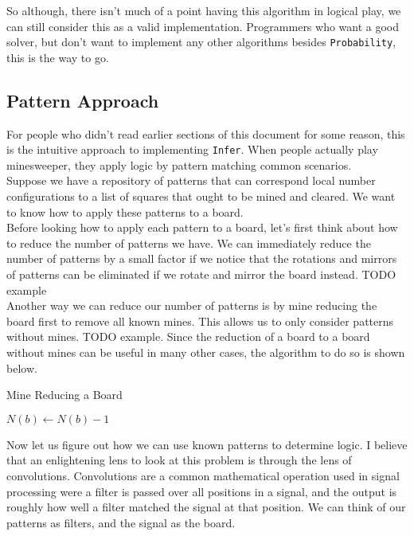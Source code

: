 So although, there isn't much of a point having this algorithm in logical play, we can still consider this as a valid implementation. Programmers who want a good solver, but don't want to implement any other algorithms besides \texttt{Probability}, this is the way to go.\\

\subsection{Pattern Approach}

For people who didn't read earlier sections of this document for some reason, this is the intuitive approach to implementing \texttt{Infer}. When people actually play minesweeper, they apply logic by pattern matching common scenarios.\\

Suppose we have a repository of patterns that can correspond local number configurations to a list of squares that ought to be mined and cleared. We want to know how to apply these patterns to a board.\\

Before looking how to apply each pattern to a board, let's first think about how to reduce the number of patterns we have. We can immediately reduce the number of patterns by a small factor if we notice that the rotations and mirrors of patterns can be eliminated if we rotate and mirror the board instead. TODO example\\

Another way we can reduce our number of patterns is by mine reducing the board first to remove all known mines. This allows us to only consider patterns without mines. TODO example. Since the reduction of a board to a board without mines can be useful in many other cases, the algorithm to do so is shown below.\\

\begin{algorithm}[h]
\caption*{Mine Reducing a Board}
\begin{algorithmic}
            $N(b)\gets N(b)-1$
        \EndIf
    \EndFor
\EndFor
{}
\EndFunction
\end{algorithmic}
\end{algorithm}

Now let us figure out how we can use known patterns to determine logic. I believe that an enlightening lens to look at this problem is through the lens of convolutions. Convolutions are a common mathematical operation used in signal processing were a filter is passed over all positions in a signal, and the output is roughly how well a filter matched the signal at that position. We can think of our patterns as filters, and the signal as the board.\\


